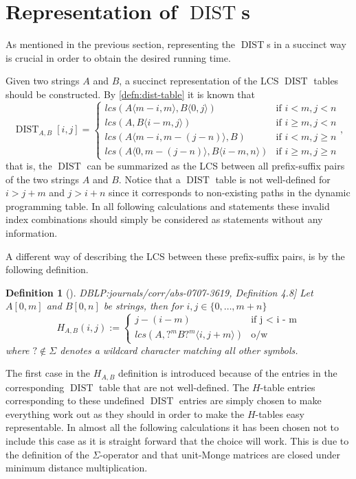 \documentclass[twoside,11pt,openright]{report}
\newcommand{\DIST}{\operatorname{DIST}}
\newcommand{\substr}[3]{#1\langle #2, #3 \rangle}
\newcommand{\str}[3]{#1[#2, #3]}
\newcommand{\refbook}[2]{\cite[#1]{DBLP:journals/corr/abs-0707-3619}, #2}
\newtheorem{mydef}{Definition}
\begin{document}
\section{Representation of $\DIST$s}
As mentioned in the previous section, representing the $\DIST$s in a succinct way is crucial in order to obtain the desired running time.

Given two strings $A$ and $B$, a succinct representation of the LCS $\DIST$ tables should be constructed. By \cref{defn:dist-table} it is known that
\[
  \DIST_{A,B}[i, j] = \left\{
    \begin{array}{ll}
      lcs(\substr{A}{m - i}{m}, \substr{B}{0}{j})             & \text{if } i < m, j < n \\
      lcs(A, \substr{B}{i - m}{j})                            & \text{if } i \geq m, j < n \\
      lcs(\substr{A}{m - i}{m - (j - n)}, B)                  & \text{if } i < m, j \geq n \\
      lcs(\substr{A}{0}{m - (j - n)}, \substr{B}{i - m}{n})   & \text{if } i \geq m, j \geq n
    \end{array}
  \right. ,
\]
that is, the $\DIST$ can be summarized as the LCS between all prefix-suffix pairs of the two strings $A$ and $B$.
Notice that a $\DIST$ table is not well-defined for $i > j + m$ and $j > i + n$ since it corresponds to non-existing paths in the dynamic programming table. In all following calculations and statements these invalid index combinations should simply be considered as statements without any information.

A different way of describing the LCS between these prefix-suffix pairs, is by the following definition.

\begin{mydef}[\refbook{p.-48}{Definition 4.8}]
  \label{def:H-table}
  Let $\str{A}{0}{m}$ and $\str{B}{0}{n}$ be strings, then for $i, j \in \{ 0, \dots, m + n \}$
  \[
    H_{A,B}(i, j) := \begin{cases}
                        j - (i - m)                         & \text{if j < i - m} \\
                        lcs(A, \substr{?^mB?^m}{i}{j + m})  & \text{o/w}
                      \end{cases}
  \]
  where $? \not\in \Sigma$ denotes a wildcard character matching all other symbols.
\end{mydef}
The first case in the $H_{A,B}$ definition is introduced because of the entries in the corresponding $\DIST$ table that are not well-defined. The $H$-table entries corresponding to these undefined $\DIST$ entries are simply chosen to make everything work out as they should in order to make the $H$-tables easy representable. In almost all the following calculations it has been chosen not to include this case as it is straight forward that the choice will work. This is due to the definition of the $\Sigma$-operator and that unit-Monge matrices are closed under minimum distance multiplication.
\end{document}
